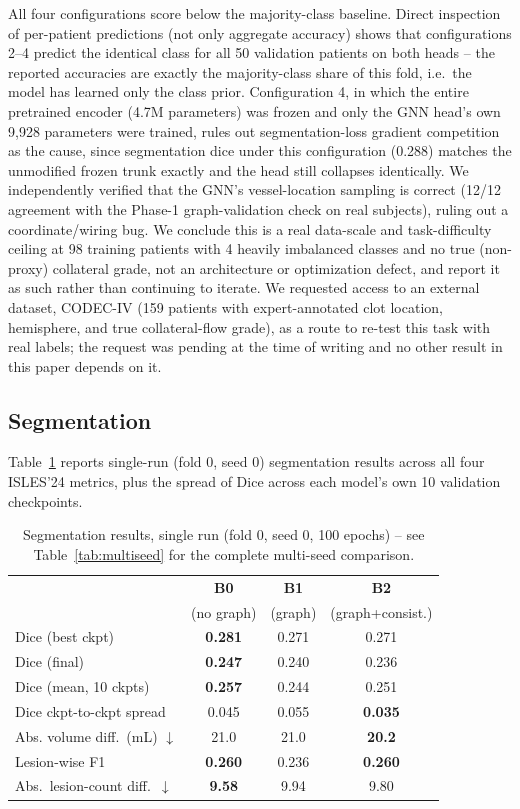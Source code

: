 \documentclass[conference]{IEEEtran}
\begin{document}
All four configurations score below the majority-class baseline. Direct inspection of per-patient predictions (not only aggregate accuracy) shows that configurations 2--4 predict the identical class for all 50 validation patients on both heads -- the reported accuracies are exactly the majority-class share of this fold, i.e.\ the model has learned only the class prior. Configuration 4, in which the entire pretrained encoder (4.7M parameters) was frozen and only the GNN head's own 9,928 parameters were trained, rules out segmentation-loss gradient competition as the cause, since segmentation dice under this configuration (0.288) matches the unmodified frozen trunk exactly and the head still collapses identically. We independently verified that the GNN's vessel-location sampling is correct (12/12 agreement with the Phase-1 graph-validation check on real subjects), ruling out a coordinate/wiring bug. We conclude this is a real data-scale and task-difficulty ceiling at 98 training patients with 4 heavily imbalanced classes and no true (non-proxy) collateral grade, not an architecture or optimization defect, and report it as such rather than continuing to iterate. We requested access to an external dataset, CODEC-IV \cite{codeciv2023} (159 patients with expert-annotated clot location, hemisphere, and true collateral-flow grade), as a route to re-test this task with real labels; the request was pending at the time of writing and no other result in this paper depends on it.

\subsection{Segmentation}
Table~\ref{tab:seg} reports single-run (fold 0, seed 0) segmentation results across all four ISLES'24 metrics, plus the spread of Dice across each model's own 10 validation checkpoints.

\begin{table}[t]
\centering
\caption{Segmentation results, single run (fold 0, seed 0, 100 epochs) -- see Table~\ref{tab:multiseed} for the complete multi-seed comparison.}
\label{tab:seg}
\begin{tabular}{lccc}
\toprule
& \textbf{B0} & \textbf{B1} & \textbf{B2} \\
& (no graph) & (graph) & (graph+consist.) \\
\midrule
Dice (best ckpt) & \textbf{0.281} & 0.271 & 0.271 \\
Dice (final) & \textbf{0.247} & 0.240 & 0.236 \\
Dice (mean, 10 ckpts) & \textbf{0.257} & 0.244 & 0.251 \\
Dice ckpt-to-ckpt spread & 0.045 & 0.055 & \textbf{0.035} \\
Abs. volume diff.\ (mL) $\downarrow$ & 21.0 & 21.0 & \textbf{20.2} \\
Lesion-wise F1 & \textbf{0.260} & 0.236 & \textbf{0.260} \\
Abs.\ lesion-count diff.\ $\downarrow$ & \textbf{9.58} & 9.94 & 9.80 \\
\bottomrule
\end{tabular}
\end{table}
\end{document}
